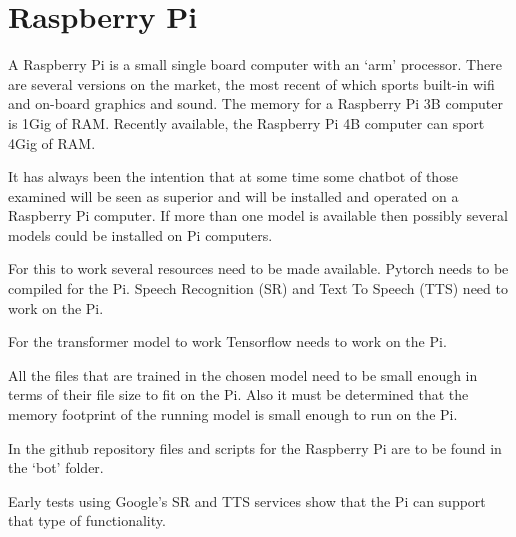 \section{Raspberry Pi}

A Raspberry Pi is a small single board computer with an `arm' processor. There are 
several versions on the market, the most recent of which sports built-in wifi and
on-board graphics and sound. The memory for a Raspberry Pi 3B computer is 1Gig of RAM. Recently
available, the Raspberry Pi 4B computer can sport 4Gig of RAM.

It has always been the intention that at some time some chatbot of
those examined will be seen as superior and will be installed and
operated on a Raspberry Pi computer. If more than one model is available
then possibly several models could be installed on Pi computers.

For this to work several resources need to be made available. Pytorch
needs to be compiled for the Pi. Speech Recognition (SR) and Text
To Speech (TTS) need to work on the Pi.

For the transformer model to work Tensorflow needs to work on the Pi.

All the files that are trained in the chosen model need to be small
enough in terms of their file size to fit on the Pi. Also it must
be determined that the memory footprint of the running model is small
enough to run on the Pi.

In the github repository files and scripts for the Raspberry Pi are
to be found in the \textquoteleft bot\textquoteright{} folder.

Early tests using Google\textquoteright s SR and TTS services show
that the Pi can support that type of functionality. 

